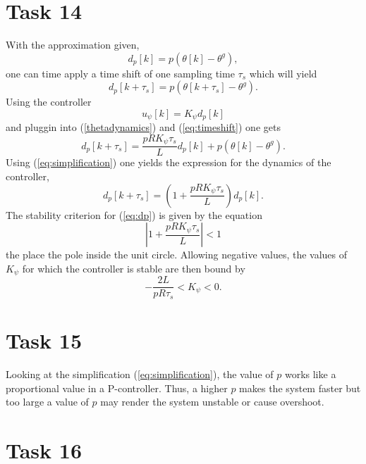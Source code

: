 \documentclass[a4paper,12pt,oneside,onecolumn]{article} %
\begin{document}
\section*{Task 14}

With the approximation given,
\begin{equation}
\label{eq:simplification}
d_p[k] = p(\theta[k] - \theta^g),
\end{equation}
one can time apply a time shift of one sampling time $\tau_s$ which will yield
\begin{equation}
\label{eq:timeshift}
d_p[k + \tau_s] = p(\theta[k + \tau_s] - \theta^g).
\end{equation}
Using the controller 
\begin{equation}
u_\psi[k] = K_\psi d_p[k]
\end{equation}
and pluggin into (\ref{thetadynamics}) and (\ref{eq:timeshift}) one gets
\begin{equation}
d_p[k + \tau_s] = \frac{p R K_\psi \tau_s}{L} d_p[k] + p(\theta[k] - \theta^g).
\end{equation}
Using (\ref{eq:simplification}) one yields the expression for the dynamics of the controller,
\begin{equation}
\label{eq:dp}
d_p[k+\tau_s] = \left ( 1 + \frac{p R K_\psi \tau_s}{L} \right ) d_p[k].
\end{equation}
The stability criterion for (\ref{eq:dp}) is given by the equation
\begin{equation}
\left | 1 + \frac{p R K_\psi \tau_s}{L} \right | < 1
\end{equation}
the place the pole inside the unit circle.
Allowing negative values, the values of $K_\psi$ for which the controller is stable are then bound by
\begin{equation}
-\frac{2L}{p R \tau_s} < K_\psi < 0.
\end{equation}
\section*{Task 15}
Looking at the simplification (\ref{eq:simplification}), the value of $p$ works like a proportional value in a P-controller. Thus, a higher $p$ makes the system faster but too large a value of $p$ may render the system unstable or cause overshoot.

\section*{Task 16}
\end{document}
